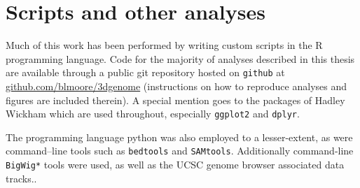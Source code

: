 \documentclass[a4paper,11pt,oneside]{book}
\begin{document}
\section{Scripts and other analyses}

Much of this work has been performed by writing custom scripts in the R programming language.\cite{Ihaka1996} Code for the majority of analyses described in this thesis are available through a public git repository hosted on \texttt{github} at \href{https://github.com/blmoore/3dgenome}{github.com/blmoore/3dgenome} (instructions on how to reproduce analyses and figures are included therein). A special mention goes to the packages of Hadley Wickham which are used throughout, especially \texttt{ggplot2}\cite{ggplot2} and \texttt{dplyr}\cite{dplyr}.

The programming language python\cite{rossum1995} was also employed to a lesser-extent, as were command--line tools such as \texttt{bedtools}\cite{Quinlan2010} and \texttt{SAMtools}\cite{Li2009}. Additionally command-line \texttt{BigWig*} tools\cite{Kent2010} were used, as well as the UCSC genome browser associated data tracks.\cite{Kent2002, Raney2014, Kuhn2013a}.

\ifstandalone
\begin{small}

\end{small}
\fi
\end{document}
